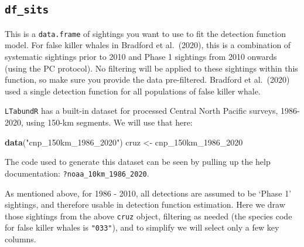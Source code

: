 \documentclass[
]{book}
\newenvironment{Shaded}{\begin{snugshade}}{\end{snugshade}}
\newcommand{\FunctionTok}[1]{\textcolor[rgb]{0.13,0.29,0.53}{\textbf{#1}}}
\newcommand{\NormalTok}[1]{#1}
\newcommand{\OtherTok}[1]{\textcolor[rgb]{0.56,0.35,0.01}{#1}}
\newcommand{\StringTok}[1]{\textcolor[rgb]{0.31,0.60,0.02}{#1}}
\begin{document}
\hypertarget{df_sits}{%
\subsection*{\texorpdfstring{\texttt{df\_sits}}{df\_sits}}\label{df_sits}}

This is a \texttt{data.frame} of sightings you want to use to fit the detection function model. For false killer whales in Bradford et al.~(2020), this is a combination of systematic sightings prior to 2010 and Phase 1 sightings from 2010 onwards (using the PC protocol). No filtering will be applied to these sightings within this function, so make sure you provide the data pre-filtered. Bradford et al.~(2020) used a single detection function for all populations of false killer whale.

\texttt{LTabundR} has a built-in dataset for processed Central North Pacific surveys, 1986-2020, using 150-km segments. We will use that here:

\begin{Shaded}
\begin{Highlighting}[]
\FunctionTok{data}\NormalTok{(}\StringTok{"cnp\_150km\_1986\_2020"}\NormalTok{)}
\NormalTok{cruz }\OtherTok{\textless{}{-}}\NormalTok{ cnp\_150km\_1986\_2020}
\end{Highlighting}
\end{Shaded}

The code used to generate this dataset can be seen by pulling up the help documentation: \texttt{?noaa\_10km\_1986\_2020}.

As mentioned above, for 1986 - 2010, all detections are assumed to be `Phase 1' sightings, and therefore usable in detection function estimation. Here we draw those sightings from the above \texttt{cruz} object, filtering as needed (the species code for false killer whales is \texttt{"033"}), and to simplify we will select only a few key columns.
\end{document}
